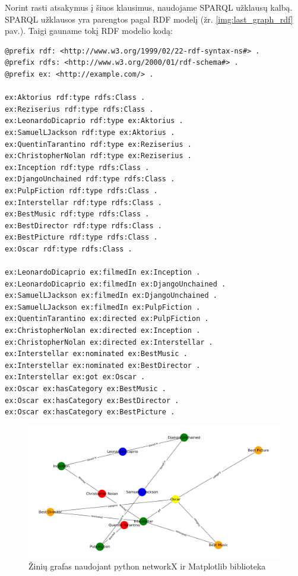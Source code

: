\documentclass{VUMIFPSkursinis}
\begin{document}
Norint rasti atsakymus į šiuos klausimus, naudojame SPARQL užklausų kalbą. SPARQL užklausos yra parengtos pagal RDF modelį (žr. \ref{img:last_graph_rdf} pav.). Taigi gauname tokį RDF modelio kodą:
\begin{lstlisting}[captionpos=b, caption=Pavyzdžio RDF modelis, label=lst:sparql,
   basicstyle=\ttfamily,frame=single]
@prefix rdf: <http://www.w3.org/1999/02/22-rdf-syntax-ns#> .
@prefix rdfs: <http://www.w3.org/2000/01/rdf-schema#> .
@prefix ex: <http://example.com/> .

ex:Aktorius rdf:type rdfs:Class .
ex:Reziserius rdf:type rdfs:Class .
ex:LeonardoDicaprio rdf:type ex:Aktorius .
ex:SamuelLJackson rdf:type ex:Aktorius .
ex:QuentinTarantino rdf:type ex:Reziserius .
ex:ChristopherNolan rdf:type ex:Reziserius .
ex:Inception rdf:type rdfs:Class .
ex:DjangoUnchained rdf:type rdfs:Class .
ex:PulpFiction rdf:type rdfs:Class .
ex:Interstellar rdf:type rdfs:Class .
ex:BestMusic rdf:type rdfs:Class .
ex:BestDirector rdf:type rdfs:Class .
ex:BestPicture rdf:type rdfs:Class .
ex:Oscar rdf:type rdfs:Class .

ex:LeonardoDicaprio ex:filmedIn ex:Inception .
ex:LeonardoDicaprio ex:filmedIn ex:DjangoUnchained .
ex:SamuelLJackson ex:filmedIn ex:DjangoUnchained .
ex:SamuelLJackson ex:filmedIn ex:PulpFiction .
ex:QuentinTarantino ex:directed ex:PulpFiction .
ex:ChristopherNolan ex:directed ex:Inception .
ex:ChristopherNolan ex:directed ex:Interstellar .
ex:Interstellar ex:nominated ex:BestMusic .
ex:Interstellar ex:nominated ex:BestDirector .
ex:Interstellar ex:got ex:Oscar .
ex:Oscar ex:hasCategory ex:BestMusic .
ex:Oscar ex:hasCategory ex:BestDirector .
ex:Oscar ex:hasCategory ex:BestPicture .
\end{lstlisting}
\pagebreak

\begin{figure}[htbp]
  \centering
  \includegraphics[width=1\textwidth]{img/last_graph_rdf.png}
  \caption{Žinių grafas naudojant python networkX ir Matplotlib biblioteka}
  \label{fig:last_graph_rdf}
\end{figure}
\end{document}
